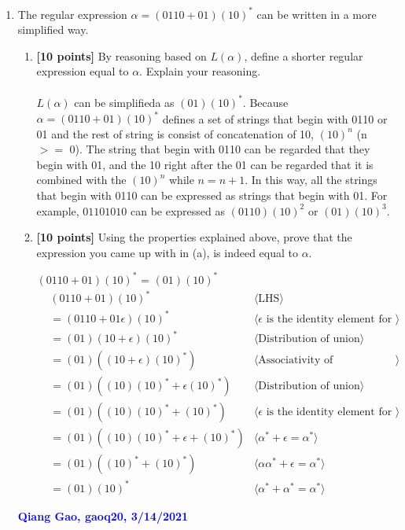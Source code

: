 \documentclass[11pt,fleqn]{article}
\newcommand{\be}{\begin{enumerate}}
\newcommand{\ee}{\end{enumerate}}
\newcommand{\sglsp}{\ }
\newenvironment{proof}{\par\noindent{\bf Proof\sglsp}}{\hfill$\Box$}
\newcommand{\pnote}[1]{{\langle \text{#1} \rangle}}
\begin{document}
	\be
	
	\item The regular expression $\alpha = (0110 + 01) (10)^*$ can be written in a more simplified way. 
	\be
	\item \textbf{[10 points]} By reasoning based on $L(\alpha)$, define a shorter regular expression equal to $\alpha$. Explain your reasoning.
	\\\\
	$L(\alpha)$ can be simplifieda as $(01) (10)^*$. Because $\alpha = (0110 + 01) (10)^*$ defines a set of strings that 
	begin with 0110 or 01 and the rest of string is consist of concatenation of 10, $(10)^n$ (n $>=$ 0).
	The string that begin with 0110 can be regarded that they begin with 01, and the 10 right after the 01 
	can be regarded that it is combined with the $(10)^n$ while $n = n + 1$. In this way, all the strings that
	begin with 0110 can be expressed as strings that begin with 01. For example, $01101010$ can be 
	expressed as $(0110) (10)^2$ or $(01) (10)^3$. 

	\item \textbf{[10 points]} Using the properties explained above, prove that the expression you came up with in (a), is indeed equal to $\alpha$.
	\begin{proof}
		$(0110 + 01) (10)^*$ = $(01) (10)^*$
	\begin{align*}
	    &  (0110 + 01) (10)^*         & \pnote{LHS}\\
	    &= (0110 + 01 \epsilon) (10)^*       & \pnote{$\epsilon$ is the identity element for concatenation}\\
		&= (01) (10 + \epsilon) (10)^* & \pnote{Distribution of union}\\
		&= (01) ((10 + \epsilon) (10)^*)           & \pnote{Associativity of concatenation}\\
		&= (01) ((10)(10)^*  + \epsilon (10)^*)                 & \pnote{Distribution of union}\\
		&= (01) ((10)(10)^*  + (10)^*)                 & \pnote{$\epsilon$ is the identity element for concatenation}\\
		&= (01) ((10)(10)^* + \epsilon + (10)^*)                 & \pnote{$\alpha^* + \epsilon = \alpha^*$}\\
		&= (01) ((10)^* + (10)^*)                 & \pnote{$\alpha\alpha^* + \epsilon = \alpha^*$}\\
		&= (01) (10)^*                 & \pnote{$\alpha^* + \alpha^* = \alpha^*$}
	  \end{align*}
	\ee
	
	\bigskip
	
	\textcolor{blue}{\textbf{Qiang Gao, gaoq20, 3/14/2021}}

        \medskip

        \noindent
        

\ee
\end{document}
